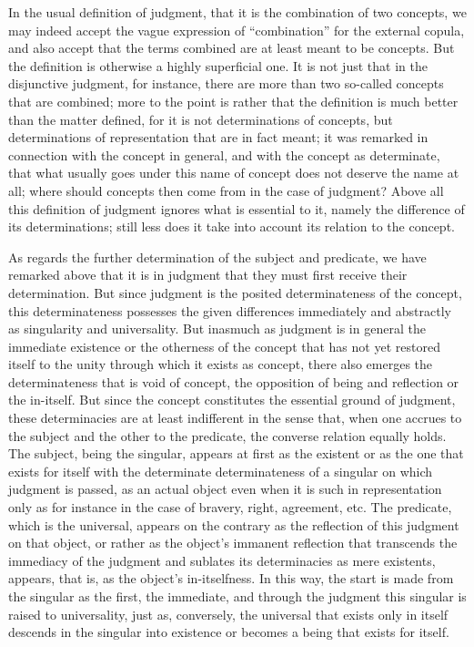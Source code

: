 In the usual definition of judgment,
that it is the combination of two concepts,
we may indeed accept the vague expression
of “combination” for the external copula,
and also accept that the terms combined are
at least meant to be concepts.
But the definition is otherwise a highly superficial one.
It is not just that in the disjunctive judgment, for instance,
there are more than two so-called concepts that are combined;
more to the point is rather that the definition is
much better than the matter defined,
for it is not determinations of concepts,
but determinations of representation that are in fact meant;
it was remarked in connection with the concept in general,
and with the concept as determinate,
that what usually goes under this name of concept
does not deserve the name at all;
where should concepts then come from in the case of judgment?
Above all this definition of judgment
ignores what is essential to it,
namely the difference of its determinations;
still less does it take into account
its relation to the concept.

As regards the further determination of the subject and predicate,
we have remarked above that it is in judgment
that they must first receive their determination.
But since judgment is the posited determinateness of the concept,
this determinateness possesses the given differences
immediately and abstractly as singularity and universality.
But inasmuch as judgment is in general the immediate existence
or the otherness of the concept that has not yet
restored itself to the unity through which it exists as concept,
there also emerges the determinateness that is void of concept,
the opposition of being and reflection or the in-itself.
But since the concept constitutes the essential ground of judgment,
these determinacies are at least indifferent in the sense that,
when one accrues to the subject and the other to the predicate,
the converse relation equally holds.
The subject, being the singular, appears at first as the existent
or as the one that exists for itself with
the determinate determinateness of a singular
on which judgment is passed,
as an actual object even when it is such in representation only
as for instance in the case of bravery, right, agreement, etc.
The predicate, which is the universal,
appears on the contrary as the reflection
of this judgment on that object,
or rather as the object's immanent reflection
that transcends the immediacy of the judgment
and sublates its determinacies as mere existents,
appears, that is, as the object's in-itselfness.
In this way, the start is made
from the singular as the first, the immediate,
and through the judgment
this singular is raised to universality,
just as, conversely,
the universal that exists only in itself
descends in the singular into existence
or becomes a being that exists for itself.


